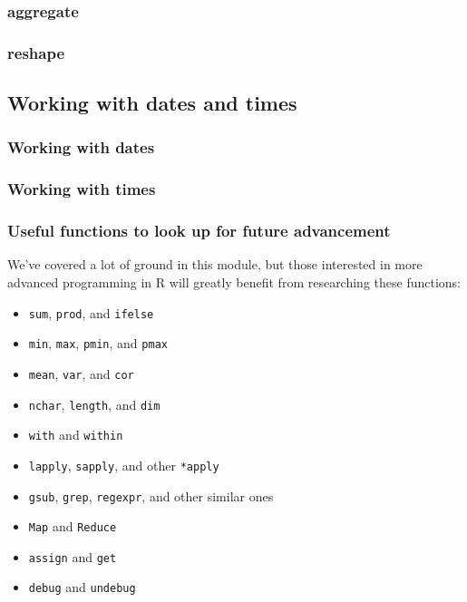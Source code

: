 \documentclass{beamer}
\begin{document}
\begin{frame}[fragile]
    \frametitle{aggregate}
    
\end{frame}


\begin{frame}[fragile]
    \frametitle{reshape}
    
\end{frame}


\subsection{Working with dates and times}

\begin{frame}[fragile]
    \frametitle{Working with dates}
    
\end{frame}


\begin{frame}[fragile]
    \frametitle{Working with times}
    
\end{frame}


\begin{frame}
    \frametitle{Useful functions to look up for future advancement}
    We've covered a lot of ground in this module,
    but those interested in more advanced programming in R
    will greatly benefit from researching these functions:\\
    
    \begin{itemize}
      \item \texttt{sum}, \texttt{prod}, and \texttt{ifelse}
      \item \texttt{min}, \texttt{max}, \texttt{pmin}, and \texttt{pmax}
      \item \texttt{mean}, \texttt{var}, and \texttt{cor}
      \item \texttt{nchar}, \texttt{length}, and \texttt{dim}
      \item \texttt{with} and \texttt{within}
      \item \texttt{lapply}, \texttt{sapply}, and other \texttt{*apply}
      \item \texttt{gsub}, \texttt{grep}, \texttt{regexpr}, and other similar ones 
      \item \texttt{Map} and \texttt{Reduce}
      \item \texttt{assign} and \texttt{get}
      \item \texttt{debug} and \texttt{undebug}
    \end{itemize}
\end{frame}
\end{document}
